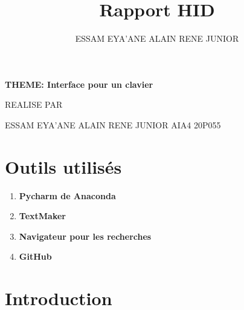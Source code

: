 \documentclass[12pt,a4paper]{report}
\author{ESSAM EYA'ANE ALAIN RENE JUNIOR }
\title{Rapport HID}
\begin{document}

\begin{center}

\begin{mybox}
\section*{}
   \bfseries  {\huge THEME: Interface pour un clavier}
\\
\end{mybox}


  \vspace*{20cm}
  {\Large REALISE PAR}

  \vspace*{0.5cm}
  {\Large ESSAM EYA'ANE ALAIN RENE JUNIOR AIA4 20P055}

\end{center}



\newpage

\tableofcontents

\newpage

\section{Outils utilisés}
\begin{enumerate}
	\item {\bfseries Pycharm de Anaconda}
	\item {\bfseries TextMaker}
	\item {\bfseries Navigateur pour les recherches}
	\item {\bfseries GitHub }
\end{enumerate}
\newpage

\section{Introduction}
\end{document}
